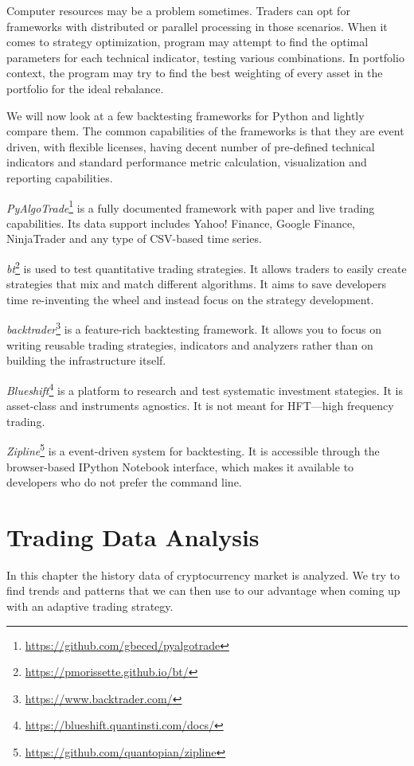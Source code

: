 Computer resources may be a problem sometimes. Traders can opt for frameworks with distributed or parallel processing in those scenarios. When it comes to strategy optimization, program may attempt to find the optimal parameters for each technical indicator, testing various combinations. In portfolio context, the program may try to find the best weighting of every asset in the portfolio for the ideal rebalance.

We will now look at a few backtesting frameworks for Python and lightly compare them. The common capabilities of the frameworks is that they are event driven, with flexible licenses, having decent number of pre-defined technical indicators and standard performance metric calculation, visualization and reporting capabilities.

\emph{PyAlgoTrade}\footnote{\url{https://github.com/gbeced/pyalgotrade}} is a fully documented framework with paper and live trading capabilities. Its data support includes Yahoo! Finance, Google Finance, NinjaTrader and any type of CSV-based time series.

\emph{bt}\footnote{\url{https://pmorissette.github.io/bt/}} is used to test quantitative trading strategies. It allows traders to easily create strategies that mix and match different algorithms. It aims to save developers time re-inventing the wheel and instead focus on the strategy development.

\emph{backtrader}\footnote{\url{https://www.backtrader.com/}} is a feature-rich backtesting framework. It allows you to focus on writing reusable trading strategies, indicators and analyzers rather than on building the infrastructure itself.

\emph{Blueshift}\footnote{\url{https://blueshift.quantinsti.com/docs/}} is a platform to research and test systematic investment stategies. It is asset-class and instruments agnostics. It is not meant for HFT---high frequency trading.

\emph{Zipline}\footnote{\url{https://github.com/quantopian/zipline}} is a event-driven system for backtesting. It is accessible through the browser-based IPython Notebook interface, which makes it available to developers who do not prefer the command line.


\chapter{Trading Data Analysis}
\label{chapter-data-analysis}

In this chapter the history data of cryptocurrency market is analyzed. We try to find trends and patterns that we can then use to our advantage when coming up with an adaptive trading strategy.

